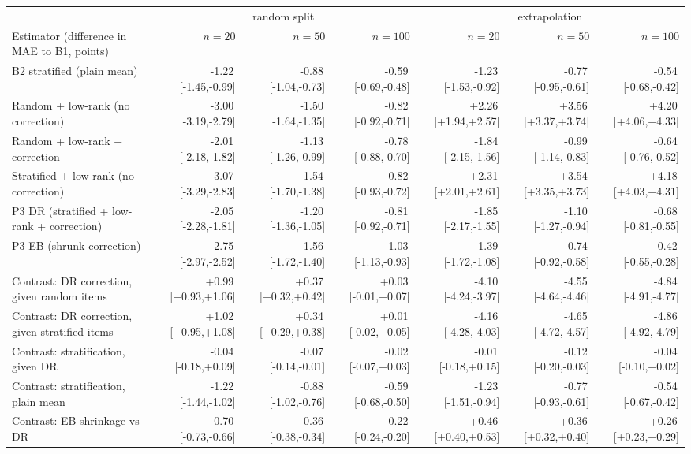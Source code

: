 {\scriptsize\setlength{\tabcolsep}{2pt}
\begin{tabular}{lrrrrrr}
\toprule
 & \multicolumn{3}{c}{random split} & \multicolumn{3}{c}{extrapolation} \\
\cmidrule(lr){2-4}\cmidrule(lr){5-7}
Estimator (difference in MAE to B1, points) & $n{=}20$ & $n{=}50$ & $n{=}100$ & $n{=}20$ & $n{=}50$ & $n{=}100$ \\
\midrule
B2 stratified (plain mean) & -1.22\,{\tiny[-1.45,-0.99]} & -0.88\,{\tiny[-1.04,-0.73]} & -0.59\,{\tiny[-0.69,-0.48]} & -1.23\,{\tiny[-1.53,-0.92]} & -0.77\,{\tiny[-0.95,-0.61]} & -0.54\,{\tiny[-0.68,-0.42]} \\
Random + low-rank (no correction) & -3.00\,{\tiny[-3.19,-2.79]} & -1.50\,{\tiny[-1.64,-1.35]} & -0.82\,{\tiny[-0.92,-0.71]} & +2.26\,{\tiny[+1.94,+2.57]} & +3.56\,{\tiny[+3.37,+3.74]} & +4.20\,{\tiny[+4.06,+4.33]} \\
Random + low-rank + correction & -2.01\,{\tiny[-2.18,-1.82]} & -1.13\,{\tiny[-1.26,-0.99]} & -0.78\,{\tiny[-0.88,-0.70]} & -1.84\,{\tiny[-2.15,-1.56]} & -0.99\,{\tiny[-1.14,-0.83]} & -0.64\,{\tiny[-0.76,-0.52]} \\
Stratified + low-rank (no correction) & -3.07\,{\tiny[-3.29,-2.83]} & -1.54\,{\tiny[-1.70,-1.38]} & -0.82\,{\tiny[-0.93,-0.72]} & +2.31\,{\tiny[+2.01,+2.61]} & +3.54\,{\tiny[+3.35,+3.73]} & +4.18\,{\tiny[+4.03,+4.31]} \\
P3 DR (stratified + low-rank + correction) & -2.05\,{\tiny[-2.28,-1.81]} & -1.20\,{\tiny[-1.36,-1.05]} & -0.81\,{\tiny[-0.92,-0.71]} & -1.85\,{\tiny[-2.17,-1.55]} & -1.10\,{\tiny[-1.27,-0.94]} & -0.68\,{\tiny[-0.81,-0.55]} \\
P3 EB (shrunk correction) & -2.75\,{\tiny[-2.97,-2.52]} & -1.56\,{\tiny[-1.72,-1.40]} & -1.03\,{\tiny[-1.13,-0.93]} & -1.39\,{\tiny[-1.72,-1.08]} & -0.74\,{\tiny[-0.92,-0.58]} & -0.42\,{\tiny[-0.55,-0.28]} \\
\midrule
Contrast: DR correction, given random items & +0.99\,{\tiny[+0.93,+1.06]} & +0.37\,{\tiny[+0.32,+0.42]} & +0.03\,{\tiny[-0.01,+0.07]} & -4.10\,{\tiny[-4.24,-3.97]} & -4.55\,{\tiny[-4.64,-4.46]} & -4.84\,{\tiny[-4.91,-4.77]} \\
Contrast: DR correction, given stratified items & +1.02\,{\tiny[+0.95,+1.08]} & +0.34\,{\tiny[+0.29,+0.38]} & +0.01\,{\tiny[-0.02,+0.05]} & -4.16\,{\tiny[-4.28,-4.03]} & -4.65\,{\tiny[-4.72,-4.57]} & -4.86\,{\tiny[-4.92,-4.79]} \\
Contrast: stratification, given DR & -0.04\,{\tiny[-0.18,+0.09]} & -0.07\,{\tiny[-0.14,-0.01]} & -0.02\,{\tiny[-0.07,+0.03]} & -0.01\,{\tiny[-0.18,+0.15]} & -0.12\,{\tiny[-0.20,-0.03]} & -0.04\,{\tiny[-0.10,+0.02]} \\
Contrast: stratification, plain mean & -1.22\,{\tiny[-1.44,-1.02]} & -0.88\,{\tiny[-1.02,-0.76]} & -0.59\,{\tiny[-0.68,-0.50]} & -1.23\,{\tiny[-1.51,-0.94]} & -0.77\,{\tiny[-0.93,-0.61]} & -0.54\,{\tiny[-0.67,-0.42]} \\
Contrast: EB shrinkage vs DR & -0.70\,{\tiny[-0.73,-0.66]} & -0.36\,{\tiny[-0.38,-0.34]} & -0.22\,{\tiny[-0.24,-0.20]} & +0.46\,{\tiny[+0.40,+0.53]} & +0.36\,{\tiny[+0.32,+0.40]} & +0.26\,{\tiny[+0.23,+0.29]} \\
\bottomrule
\end{tabular}}
